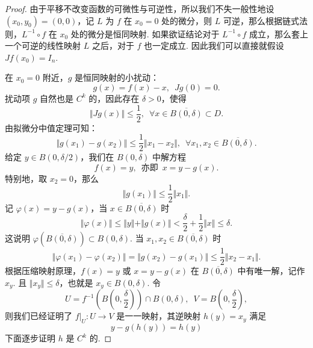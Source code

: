 \begin{proof}

    由于平移不改变函数的可微性与可逆性，所以我们不失一般性地设 $(x_0, y_0) = (0, 0)$，记 $L$ 为 $f$ 在 $x_0 = 0$ 处的微分，则 $L$ 可逆，那么根据链式法则，$L^{-1}\circ f$ 在 $x_0$ 处的微分是恒同映射. 如果欲证结论对于 $L^{-1}\circ f$ 成立，那么套上一个可逆的线性映射 $L$ 之后，对于 $f$ 也一定成立. 因此我们可以直接就假设 $Jf(x_0) = I_n$.

    在 $x_0 = 0$ 附近，$g$ 是恒同映射的小扰动：\[g(x) = f(x) - x,\enspace Jg(0) = 0.\]
    扰动项 $g$ 自然也是 $C^k$ 的，因此存在 $\delta > 0$，使得\[\Vert Jg(x)\Vert \leqslant \frac{1}{2},\enspace \forall x\in \overline{B(0, \delta)}\subset D.\]
    由拟微分中值定理可知：\[\Vert g(x_1) - g(x_2)\Vert \leqslant \frac{1}{2}\Vert x_1 - x_2\Vert,\enspace \forall x_1, x_2\in \overline{B(0, \delta)}.\]
    给定 $y\in B(0, \delta/2)$，我们在 $B(0, \delta)$ 中解方程 \[f(x) = y,\enspace\text{亦即}\enspace x = y - g(x).\]
    特别地，取 $x_2 = 0$，那么 \[\Vert g(x_1) \Vert \leqslant \frac{1}{2}\Vert x_1\Vert.\]
    记 $\varphi(x) = y - g(x)$，当 $x\in \overline{B(0, \delta)}$ 时\[\Vert \varphi(x)\Vert \leqslant \Vert y\Vert +\Vert g(x)\Vert < \frac{\delta}{2} + \frac{1}{2}\Vert x\Vert \leqslant \delta.\]
    这说明 $\varphi(\overline{B(0, \delta)})\subset B(0, \delta)$. 当 $x_1, x_2\in \overline{B(0, \delta)}$ 时\[\Vert \varphi(x_1) - \varphi(x_2) \Vert = \Vert g(x_2) - g(x_1)\Vert \leqslant \frac{1}{2}\Vert x_2 - x_1\Vert.\]
    根据压缩映射原理，$f(x) = y$ 或 $x = y - g(x)$ 在 $\overline{B(0, \delta)}$ 中有唯一解，记作 $x_y$. 且 $\Vert x_y\Vert \leqslant \delta$，也就是 $x_y\in B(0, \delta)$. 令\[U = f^{-1}(B(0, \frac{\delta}{2}))\cap B(0, \delta),\enspace V = B(0, \frac{\delta}{2}),\]
    则我们已经证明了 $f|_U \colon U\to V$ 是一一映射，其逆映射 $h(y) = x_y$ 满足 \[y - g(h(y)) = h(y)\]
    下面逐步证明 $h$ 是 $C^k$ 的.


\end{proof}
